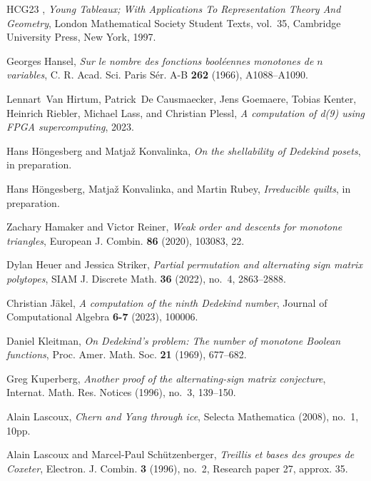 \documentclass[12pt]{amsart}
\numberwithin{equation}{section}
\theoremstyle{definition}
\begin{document}
\begin{thebibliography}{HCG{\etalchar{+}}23}
\bysame, \emph{{Young Tableaux; With Applications To Representation Theory And
  Geometry}}, London Mathematical Society Student Texts, vol.~35, Cambridge
  University Press, New York, 1997.

Georges Hansel, \emph{Sur le nombre des fonctions bool\'eennes monotones de
  {$n$} variables}, C. R. Acad. Sci. Paris S\'er. A-B \textbf{262} (1966),
  A1088--A1090.

Lennart~Van Hirtum, Patrick~De Causmaecker, Jens Goemaere, Tobias Kenter,
  Heinrich Riebler, Michael Lass, and Christian Plessl, \emph{A computation of
  d(9) using {FPGA} supercomputing}, 2023.

Hans H\"ongesberg and Matja{\v z} Konvalinka, \emph{On the shellability of
  {D}edekind posets}, in preparation.

Hans H\"ongesberg, Matja{\v z} Konvalinka, and Martin Rubey, \emph{Irreducible
  quilts}, in preparation.

Zachary Hamaker and Victor Reiner, \emph{Weak order and descents for monotone
  triangles}, European J. Combin. \textbf{86} (2020), 103083, 22.

Dylan Heuer and Jessica Striker, \emph{Partial permutation and alternating sign
  matrix polytopes}, SIAM J. Discrete Math. \textbf{36} (2022), no.~4,
  2863--2888.

Christian J{\"a}kel, \emph{A computation of the ninth {D}edekind number},
  Journal of Computational Algebra \textbf{6-7} (2023), 100006.

Daniel Kleitman, \emph{On {D}edekind's problem: {T}he number of monotone
  {B}oolean functions}, Proc. Amer. Math. Soc. \textbf{21} (1969), 677--682.

Greg Kuperberg, \emph{Another proof of the alternating-sign matrix conjecture},
  Internat. Math. Res. Notices (1996), no.~3, 139--150.

Alain Lascoux, \emph{Chern and {Y}ang through ice}, Selecta Mathematica (2008),
  no.~1, 10pp.

Alain Lascoux and Marcel-Paul Sch\"{u}tzenberger, \emph{Treillis et bases des
  groupes de {C}oxeter}, Electron. J. Combin. \textbf{3} (1996), no.~2,
  Research paper 27, approx. 35.


\end{thebibliography}
\end{document}
